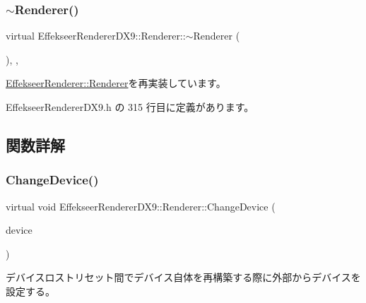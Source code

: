 \subsubsection{\texorpdfstring{$\sim$\+Renderer()}{~Renderer()}}
{\footnotesize\ttfamily virtual Effekseer\+Renderer\+D\+X9\+::\+Renderer\+::$\sim$\+Renderer (\begin{DoxyParamCaption}{ }\end{DoxyParamCaption})\hspace{0.3cm}{\ttfamily [inline]}, {\ttfamily [protected]}, {\ttfamily [virtual]}}



\mbox{\hyperlink{class_effekseer_renderer_1_1_renderer_ad85143b942b06b4fa4741713f7bcd84b}{Effekseer\+Renderer\+::\+Renderer}}を再実装しています。



 Effekseer\+Renderer\+D\+X9.\+h の 315 行目に定義があります。



\subsection{関数詳解}
\mbox{\label{class_effekseer_renderer_d_x9_1_1_renderer_a08f6d85779736243059040d86c573df8}} 
\subsubsection{\texorpdfstring{Change\+Device()}{ChangeDevice()}}
{\footnotesize\ttfamily virtual void Effekseer\+Renderer\+D\+X9\+::\+Renderer\+::\+Change\+Device (\begin{DoxyParamCaption}\item[{L\+P\+D\+I\+R\+E\+C\+T3\+D\+D\+E\+V\+I\+C\+E9}]{device }\end{DoxyParamCaption})\hspace{0.3cm}{\ttfamily [pure virtual]}}



デバイスロストリセット間でデバイス自体を再構築する際に外部からデバイスを設定する。 

\mbox{\label{class_effekseer_renderer_d_x9_1_1_renderer_aadd9f57a16e8291dccd27d2e1c03edc4}} 
